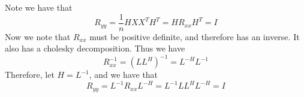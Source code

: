 \documentclass{homework}
\begin{document}
\begin{solution}
  Note we have that 
\[ R_{yy} = \frac{1}{n} HXX^TH^T = HR_{xx}H^T = I\]
  Now we note that $R_{xx}$ must be positive definite, and therefore has an inverse. It also has a cholesky decomposition. Thus we have 
  \[ R_{xx}^{-1} = (LL^H)^{-1} = L^{-H}L^{-1}\]
  Therefore, let $H = L^{-1}$, and we have that
  \[R_{yy} = L^{-1}R_{xx}L^{-H} = L^{-1}LL^{H}L^{-H} = I\]
\end{solution}
\end{document}
